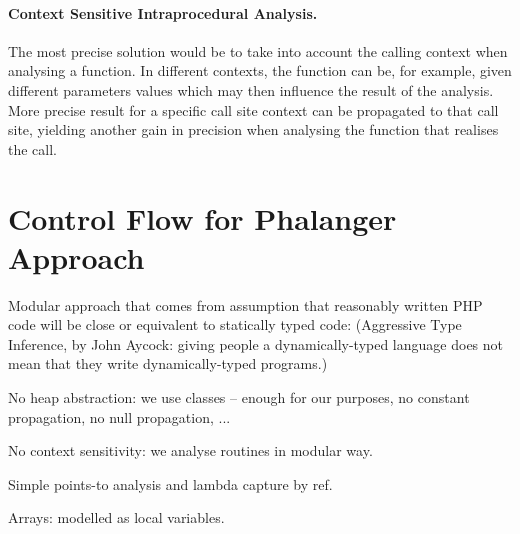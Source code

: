         \paragraph{Context Sensitive Intraprocedural Analysis.}
        The most precise solution would be to take into account 
        the calling context when analysing a function. 
        In different contexts, the function can be, 
        for example, given different parameters values 
        which may then influence the result of the analysis. 
        More precise result for a specific call site context 
        can be propagated to that call site, 
        yielding another gain in precision when 
        analysing the function that realises the call.
        
        \paragraph*{}
    
    \section{Control Flow for Phalanger Approach}
        
        \begin{itemize*}
            \item Modular approach that comes from assumption that 
                reasonably written PHP code will be close or equivalent to 
                statically typed code: (Aggressive Type Inference, by John Aycock: giving people 
                a dynamically-typed language does not mean that they write dynamically-typed programs.)
                \begin{itemize*}
                    \item No heap abstraction: we use classes -- enough for our purposes, no constant propagation, no null propagation, ...
                    \item No context sensitivity: we analyse routines in modular way.
                    \item Simple points-to analysis and lambda capture by ref.
                    \item Arrays: modelled as local variables.
                \end{itemize*}
        \end{itemize*}
        